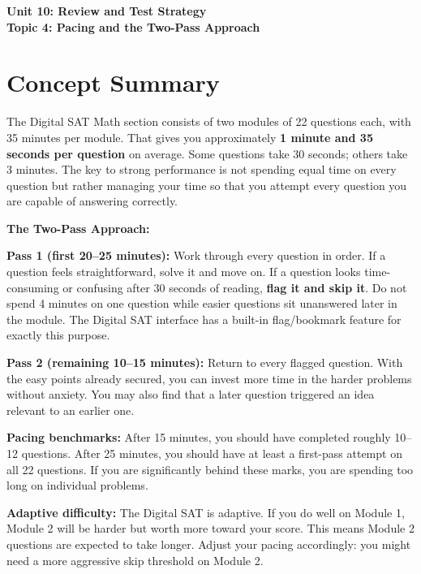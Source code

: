 \documentclass[14pt]{extarticle}
\begin{document}
\raggedright
{}

\begin{center}
    \LARGE \textbf{Unit 10: Review and Test Strategy} \\[6pt]
    \Large \textbf{Topic 4: Pacing and the Two-Pass Approach}
\end{center}

\vspace{1em}

\section*{Concept Summary}

The Digital SAT Math section consists of two modules of 22 questions each, with 35 minutes per module. That gives you approximately \textbf{1 minute and 35 seconds per question} on average. Some questions take 30 seconds; others take 3 minutes. The key to strong performance is not spending equal time on every question but rather managing your time so that you attempt every question you are capable of answering correctly.

\textbf{The Two-Pass Approach:}

\textbf{Pass 1 (first 20--25 minutes):} Work through every question in order. If a question feels straightforward, solve it and move on. If a question looks time-consuming or confusing after 30 seconds of reading, \textbf{flag it and skip it}. Do not spend 4 minutes on one question while easier questions sit unanswered later in the module. The Digital SAT interface has a built-in flag/bookmark feature for exactly this purpose.

\textbf{Pass 2 (remaining 10--15 minutes):} Return to every flagged question. With the easy points already secured, you can invest more time in the harder problems without anxiety. You may also find that a later question triggered an idea relevant to an earlier one.

\textbf{Pacing benchmarks:} After 15 minutes, you should have completed roughly 10--12 questions. After 25 minutes, you should have at least a first-pass attempt on all 22 questions. If you are significantly behind these marks, you are spending too long on individual problems.

\textbf{Adaptive difficulty:} The Digital SAT is adaptive. If you do well on Module 1, Module 2 will be harder but worth more toward your score. This means Module 2 questions are expected to take longer. Adjust your pacing accordingly: you might need a more aggressive skip threshold on Module 2.
\end{document}
